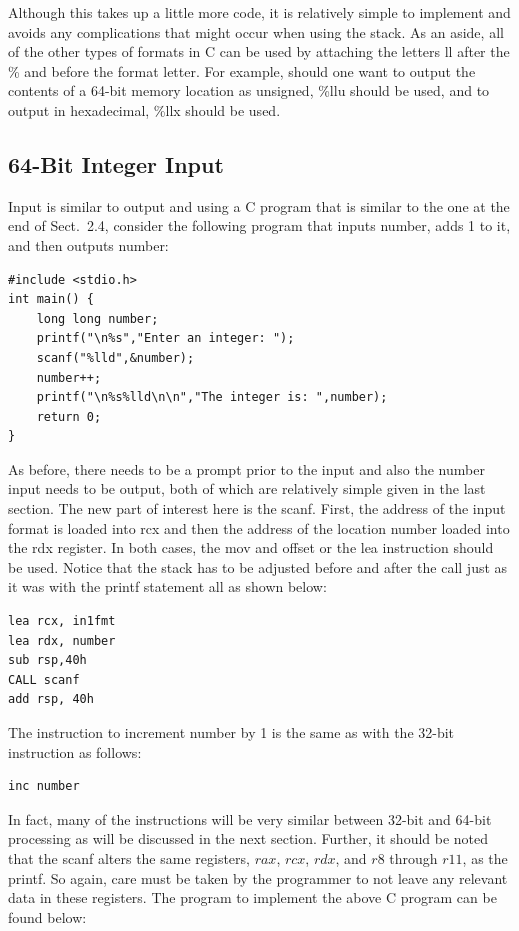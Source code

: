 \documentclass[10pt]{book}
\begin{document}
Although this takes up a little more code, it is relatively simple to implement and avoids any complications that might occur when using the stack. As an aside, all of the other types of formats in C can be used by attaching the letters ll after the \% and before the format letter. For example, should one want to output the contents of a 64-bit memory location as unsigned, \%llu should be used, and to output in hexadecimal, \%llx should be used.

\subsection{64-Bit Integer Input}
Input is similar to output and using a C program that is similar to the one at the end of Sect.\ 2.4, consider the following program that inputs number, adds 1 to it, and then outputs number:

\begin{verbatim}
#include <stdio.h>
int main() {
    long long number;
    printf("\n%s","Enter an integer: ");
    scanf("%lld",&number);
    number++;
    printf("\n%s%lld\n\n","The integer is: ",number);
    return 0;
}
\end{verbatim}

As before, there needs to be a prompt prior to the input and also the number input needs to be output, both of which are relatively simple given in the last section. The new part of interest here is the scanf. First, the address of the input format is loaded into rcx and then the address of the location number loaded into the rdx register. In both cases, the mov and offset or the lea instruction should be used. Notice that the stack has to be adjusted before and after the call just as it was with the printf statement all as shown below:
\begin{verbatim}
lea rcx, in1fmt
lea rdx, number
sub rsp,40h
CALL scanf
add rsp, 40h
\end{verbatim}

The instruction to increment number by 1 is the same as with the 32-bit instruction as follows:

\begin{verbatim}
inc number
\end{verbatim}

In fact, many of the instructions will be very similar between 32-bit and 64-bit processing as will be discussed in the next section. Further, it should be noted that the scanf alters the same registers, $rax$, $rcx$, $rdx$, and $r8$ through $r11$, as the printf. So again, care must be taken by the programmer to not leave any relevant data in these registers. The program to implement the above C program can be found below:
\end{document}
